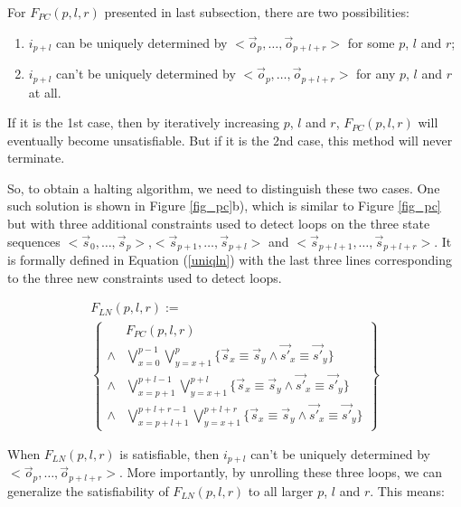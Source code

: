 \documentclass[twocolumn]{article}
\begin{document}
For $F_{PC}(p,l,r)$ presented in last subsection,
there are two possibilities:
\begin{enumerate}
 \item 
$i_{p+l}$ can be uniquely determined by $<\vec{o}_{p},\dots,\vec{o}_{p+l+r}>$ for some $p$, $l$ and $r$;
 \item 
$i_{p+l}$ can't be uniquely determined by $<\vec{o}_{p},\dots,\vec{o}_{p+l+r}>$ for any $p$, $l$ and $r$ at all.
\end{enumerate}

If it is the 1st case,
then by iteratively increasing  $p$, $l$ and $r$,
$F_{PC}(p,l,r)$ will eventually become unsatisfiable.
But if it is the 2nd case,
this method will never terminate.



So,
to obtain a halting algorithm,
we need to distinguish these two cases.
One such solution is shown in Figure \ref{fig_pc}b),
which is similar to Figure \ref{fig_pc} but with three additional constraints used to detect loops 
on the three state sequences $<\vec{s}_{0},\dots,\vec{s}_{p}>$,$<\vec{s}_{p+1},\dots,\vec{s}_{p+l}>$ and 
$<\vec{s}_{p+l+1},\dots,\vec{s}_{p+l+r}>$.
It is formally defined in Equation (\ref{uniqln}) with the last three lines corresponding to the three new constraints used to detect loops.

\begin{multline}\label{uniqln}
F_{LN}(p,l,r):=\\
\left\{
\begin{array}{cc}
&F_{PC}(p,l,r)\\
\wedge&\bigvee_{x=0}^{p-1}\bigvee_{y=x+1}^{p} \{\vec{s}_x\equiv \vec{s}_y\wedge \vec{s'}_x\equiv \vec{s'}_y\} \\
\wedge&\bigvee_{x=p+1}^{p+l-1}\bigvee_{y=x+1}^{p+l} \{\vec{s}_x\equiv \vec{s}_y\wedge \vec{s'}_x\equiv \vec{s'}_y\} \\
\wedge&\bigvee_{x=p+l+1}^{p+l+r-1}\bigvee_{y=x+1}^{p+l+r} \{\vec{s}_x\equiv \vec{s}_y\wedge \vec{s'}_x\equiv \vec{s'}_y\}
\end{array}
\right\}
\end{multline}



When $F_{LN}(p,l,r)$ is satisfiable,
then $i_{p+l}$ can't be uniquely determined by $<\vec{o}_{p},\dots,\vec{o}_{p+l+r}>$.
More importantly,
by unrolling these three loops,
we can generalize the satisfiability of $F_{LN}(p,l,r)$ to all larger $p$, $l$ and $r$.
This means:
\end{document}
